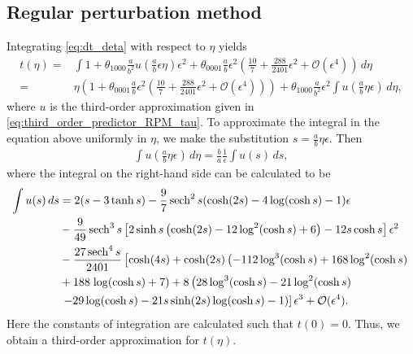 \subsection*{Regular perturbation method}
Integrating \cref{eq:dt_deta} with respect to $\eta$ yields
\begin{equation}
\label{eq:tOfTauRegular}
\begin{aligned}
    t(\eta) ={}& \int 1 + \theta_{1000} \frac{a}{b^2}
				u\left(\frac{a}{b}\epsilon \eta \right) \epsilon^2
        + \theta_{0001}\frac{a}{b}\epsilon^2\left(\frac{10}{7}+ \frac{288}{2401}\epsilon^2
				+ \mathcal{O}(\epsilon^4) \right) \, d\eta \\
				={}& \eta \left( 1 + \theta_{0001}\frac{a}{b}\epsilon^2\left(\frac{10}{7}+ \frac{288}{2401} \epsilon^2 + \mathcal{O}(\epsilon^4) \right) \right) + 
				 \theta_{1000} \frac{a}{b^2} \epsilon^2 \int  
				     u\left(\frac{a}{b}\eta\epsilon \right)
					 \, d\eta,
\end{aligned}
\end{equation}
where $u$ is the third-order approximation given in
\cref{eq:third_order_predictor_RPM_tau}. To approximate the integral in the
equation above uniformly in $\eta$, we make the substitution $s = \frac a b \eta
\epsilon$. Then
\begin{equation*}
\begin{aligned}
\int  u\left(\frac{a}{b}\eta\epsilon\right) \, d\eta
= \frac{b}{a} \frac{1}{\epsilon} \int u(s) \, ds,
\end{aligned}
\end{equation*}
where the integral on the right-hand side can be calculated to be
\begin{equation}
\label{eq:u_int_s}
\begin{aligned}
    \int u(s) \, ds &= 2 (s-3 \tanh s) -\frac{9}{7} \operatorname{sech}^2s (\cosh (2 s)-4 \log (\cosh s)-1)\epsilon \\
                    &-\frac{9}{49} \operatorname{sech}^3 s \left[2 \sinh s \left(\cosh (2 s)-12 \log ^2(\cosh s)+6\right)-12 s \cosh s\right]\epsilon^2 \\ 
    &-\frac{27 \operatorname{sech}^4s}{2401} \left[\cosh(4s)+\cosh(2s) \left(-112
    \log^3(\cosh s)+168 \log ^2(\cosh s) \right. \right. \\
    &+188 \left. \log (\cosh s)+7\right)+8 \left(28 \log ^3(\cosh s)-21 \log ^2(\cosh s) \right. \\
    & \left.\left. -29 \log (\cosh s)-21 s \sinh (2 s) \log (\cosh s)-1\right)\right] \epsilon^3
        + \mathcal{O}(\epsilon^4).
\end{aligned}
\end{equation}
Here the constants of integration are calculated such that $t(0)=0$.  Thus, we
obtain a third-order approximation for $t(\eta)$. 


